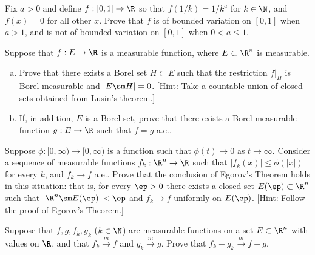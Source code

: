 \begin{hw} \label{hw:20}
Fix $a>0$ and define $f: [0, 1] \to \R$ so that $f(1/k)=1/k^a$ for $k \in \N$, and $f(x)=0$ for all other $x$. Prove that $f$ is of bounded variation on $[0, 1]$ when $a>1$, and is not of bounded variation on $[0, 1]$ when $0 < a \leq 1$. \\
\end{hw}






\begin{hw} \label{hw:21}
Suppose that $f: E \to \R$ is a measurable function, where $E \subset \R^n$ is measurable. 
	\begin{enumerate}[(a)]
	\item Prove that there exists a Borel set $H \subset E$ such that the restriction $f\big|_H$ is Borel measurable and $|E \sm H|=0$. [Hint: Take a countable union of closed sets obtained from Lusin's theorem.] 
	\item If, in addition, $E$ is a Borel set, prove that there exists a Borel measurable function $g: E \to \R$ such that $f=g$ a.e.. \\
	\end{enumerate}
\end{hw}


\begin{hw} \label{hw:22}
Suppose $\phi \colon [0, \infty) \to [0,\infty)$ is a function such that $\phi(t) \to 0$ as $t \to \infty$. Consider a sequence of measurable functions $f_k: \R^n \to \R$ such that $|f_k(x)|\leq \phi(|x|)$ for every $k$, and $f_k \to f$ a.e.. Prove that the conclusion of Egorov's Theorem holds in this situation: that is, for every $\ep>0$ there exists a closed set $E(\ep) \subset \R^n$ such that $|\R^n \sm E(\ep)| < \ep$ and $f_k \to f$ uniformly on $E(\ep)$.  [Hint: Follow the proof of Egorov's Theorem.] \\
\end{hw}






\begin{hw} \label{hw:23}
Suppose that $f, g, f_k, g_k$ ($k \in \N$)  are measurable functions on a set $E \subset \R^n$ with values on $\R$, and that $f_k \xrightarrow{m} f$ and $g_k \xrightarrow{m} g$. Prove that $f_k + g_k \xrightarrow{m} f+g$. \\
\end{hw}


